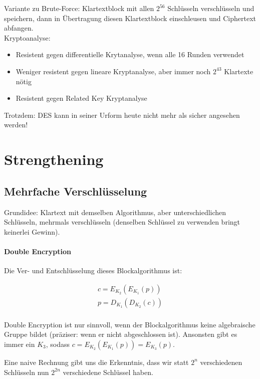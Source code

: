 Variante zu Brute-Force: Klartextblock mit allen $2^{56}$ Schlüsseln verschlüsseln und speichern, dann in Übertragung diesen
Klartextblock einschleusen und Ciphertext abfangen. \\

Kryptoanalyse: 

\begin{itemize}
    \item Resistent gegen differentielle Krytanalyse, wenn alle 16 Runden verwendet
    \item Weniger resistent gegen lineare Kryptanalyse, aber immer noch $2^{43}$ Klartexte nötig
    \item Resistent gegen Related Key Kryptanalyse
\end{itemize}

Trotzdem: DES kann in seiner Urform heute nicht mehr als sicher angesehen werden!


\section{Strengthening}

\subsection{Mehrfache Verschlüsselung}

Grundidee: Klartext mit demselben Algorithmus, aber unterschiedlichen Schlüsseln, mehrmals verschlüsseln (denselben Schlüssel zu verwenden bringt keinerlei Gewinn).

\paragraph{Double Encryption}

Die Ver- und Entschlüsselung dieses Blockalgorithmus ist:

\begin{align*}
    c = E_{K_2}\left( E_{K_1}(p) \right) \\
    p = D_{K_1}\left( D_{K_2}(c) \right) \\
\end{align*}

Double Encryption ist nur sinnvoll, wenn der Blockalgorithmus keine algebraische Gruppe bildet (präziser: wenn er nicht abgeschlossen ist). Ansonsten gibt es immer ein 
$K_3$, sodass $c = E_{K_2}\left( E_{K_1}(p) \right) = E_{K_3}(p)$.

Eine naive Rechnung gibt uns die Erkenntnis, dass wir statt $2^n$ verschiedenen Schlüsseln nun $2^{2n}$ verschiedene Schlüssel haben.

